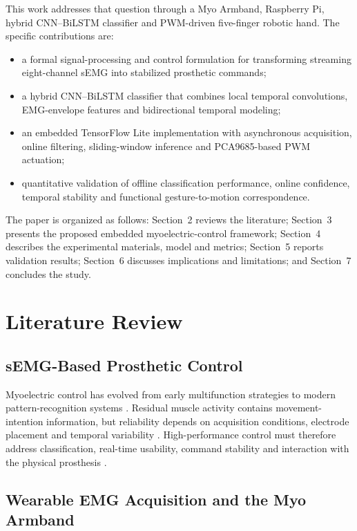 \documentclass[technologies,article,submit,pdftex,moreauthors]{Definitions/mdpi}
\begin{document}
This work addresses that question through a Myo Armband, Raspberry Pi, hybrid CNN--BiLSTM classifier and PWM-driven five-finger robotic hand. The specific contributions are:

\begin{itemize}
    \item a formal signal-processing and control formulation for transforming streaming eight-channel sEMG into stabilized prosthetic commands;
    \item a hybrid CNN--BiLSTM classifier that combines local temporal convolutions, EMG-envelope features and bidirectional temporal modeling;
    \item an embedded TensorFlow Lite implementation with asynchronous acquisition, online filtering, sliding-window inference and PCA9685-based PWM actuation;
    \item quantitative validation of offline classification performance, online confidence, temporal stability and functional gesture-to-motion correspondence.
\end{itemize}

The paper is organized as follows: Section~2 reviews the literature; Section~3 presents the proposed embedded myoelectric-control framework; Section~4 describes the experimental materials, model and metrics; Section~5 reports validation results; Section~6 discusses implications and limitations; and Section~7 concludes the study.

\section{Literature Review}

\subsection{sEMG-Based Prosthetic Control}

Myoelectric control has evolved from early multifunction strategies to modern pattern-recognition systems \cite{Hudgins1993,Englehart2003,Oskoei2007,Scheme2011}. Residual muscle activity contains movement-intention information, but reliability depends on acquisition conditions, electrode placement and temporal variability \cite{Farina2014,Chowdhury2013,Merletti1997}. High-performance control must therefore address classification, real-time usability, command stability and interaction with the physical prosthesis \cite{Kuiken2009,Cipriani2011,Ha2011}.

\subsection{Wearable EMG Acquisition and the Myo Armband}
\end{document}
